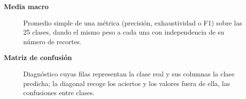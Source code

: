 \begin{description}
  \item[\textbf{Media macro}] Promedio simple de una métrica (precisión, exhaustividad o F1) sobre las 25 clases, dando el mismo peso a cada una con independencia de su número de recortes.
  \item[\textbf{Matriz de confusión}] Diagnóstico cuyas filas representan la clase real y sus columnas la clase predicha; la diagonal recoge los aciertos y los valores fuera de ella, las confusiones entre clases.
\end{description}